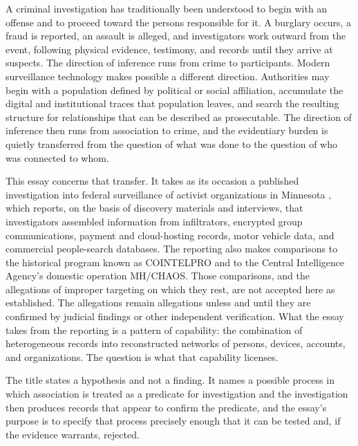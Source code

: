 \documentclass[11pt]{article}
\theoremstyle{definition}
\theoremstyle{remark}
\begin{document}
A criminal investigation has traditionally been understood to begin with an offense and to proceed toward the persons responsible for it. A burglary occurs, a fraud is reported, an assault is alleged, and investigators work outward from the event, following physical evidence, testimony, and records until they arrive at suspects. The direction of inference runs from crime to participants. Modern surveillance technology makes possible a different direction. Authorities may begin with a population defined by political or social affiliation, accumulate the digital and institutional traces that population leaves, and search the resulting structure for relationships that can be described as prosecutable. The direction of inference then runs from association to crime, and the evidentiary burden is quietly transferred from the question of what was done to the question of who was connected to whom.

This essay concerns that transfer. It takes as its occasion a published investigation into federal surveillance of activist organizations in Minnesota \cite{wired2026}, which reports, on the basis of discovery materials and interviews, that investigators assembled information from infiltrators, encrypted group communications, payment and cloud-hosting records, motor vehicle data, and commercial people-search databases. The reporting also makes comparisons to the historical program known as COINTELPRO and to the Central Intelligence Agency's domestic operation MH/CHAOS. Those comparisons, and the allegations of improper targeting on which they rest, are not accepted here as established. The allegations remain allegations unless and until they are confirmed by judicial findings or other independent verification. What the essay takes from the reporting is a pattern of capability: the combination of heterogeneous records into reconstructed networks of persons, devices, accounts, and organizations. The question is what that capability licenses.

The title states a hypothesis and not a finding. It names a possible process in which association is treated as a predicate for investigation and the investigation then produces records that appear to confirm the predicate, and the essay's purpose is to specify that process precisely enough that it can be tested and, if the evidence warrants, rejected.
\end{document}

